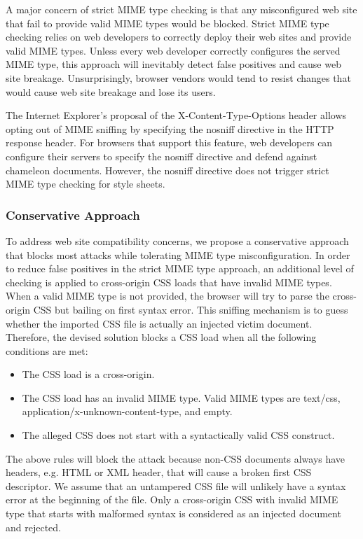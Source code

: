 \documentclass{acm_proc_article-sp}
\begin{document}
{A major concern of strict MIME type checking is that any misconfigured web site that fail to provide valid MIME types would be blocked. Strict MIME type checking relies on web developers to correctly deploy their web sites and provide valid MIME types. Unless every web developer correctly configures the served MIME type, this approach will inevitably detect false positives and cause web site breakage. Unsurprisingly, browser vendors would tend to resist changes that would cause web site breakage and lose its users.

The Internet Explorer's proposal of the X-Content-Type-Options header \cite{nosniff} allows opting out of MIME sniffing by specifying the nosniff directive in the HTTP response header. For browsers that support this feature, web developers can configure their servers to specify the nosniff directive and defend against chameleon documents. However, the nosniff directive does not trigger strict MIME type checking for style sheets.

\subsubsection{Conservative Approach}
To address web site compatibility concerns, we propose a conservative approach that blocks most attacks while tolerating MIME type misconfiguration. In order to reduce false positives in the strict MIME type approach, an additional level of checking is applied to cross-origin CSS loads that have invalid MIME types. When a valid MIME type is not provided, the browser will try to parse the cross-origin CSS but bailing on first syntax error. This sniffing mechanism is to guess whether the imported CSS file is actually an injected victim document. Therefore, the devised solution blocks a CSS load when all the following conditions are met:
\begin{itemize}
\item{The CSS load is a cross-origin.}
\item{The CSS load has an invalid MIME type. Valid MIME types are text/css, application/x-unknown-content-type, and empty.}
\item{The alleged CSS does not start with a syntactically valid CSS construct.}
\end{itemize}
The above rules will block the attack because non-CSS documents always have headers, e.g. HTML or XML header, that will cause a broken first CSS descriptor. We assume that an untampered CSS file will unlikely have a syntax error at the beginning of the file. Only a cross-origin CSS with invalid MIME type that starts with malformed syntax is considered as an injected document and rejected.

}
\end{document}
